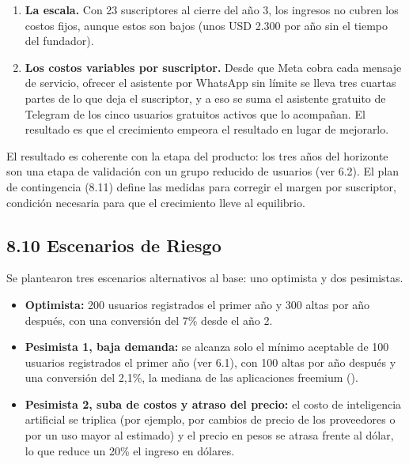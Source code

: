 \begin{enumerate}
\def\labelenumi{\arabic{enumi}.}
\tightlist
\item
  \textbf{La escala.} Con 23 suscriptores al cierre del año 3, los
  ingresos no cubren los costos fijos, aunque estos son bajos (unos USD
  2.300 por año sin el tiempo del fundador).
\item
  \textbf{Los costos variables por suscriptor.} Desde que Meta cobra
  cada mensaje de servicio, ofrecer el asistente por WhatsApp sin límite
  se lleva tres cuartas partes de lo que deja el suscriptor, y a eso se
  suma el asistente gratuito de Telegram de los cinco usuarios gratuitos
  activos que lo acompañan. El resultado es que el crecimiento empeora
  el resultado en lugar de mejorarlo.
\end{enumerate}

El resultado es coherente con la etapa del producto: los tres años del
horizonte son una etapa de validación con un grupo reducido de usuarios
(ver 6.2). El plan de contingencia (8.11) define las medidas para
corregir el margen por suscriptor, condición necesaria para que el
crecimiento lleve al equilibrio.

\subsection*{8.10 Escenarios de Riesgo}\label{escenarios-de-riesgo}

Se plantearon tres escenarios alternativos al base: uno optimista y dos
pesimistas.

\begin{itemize}
\tightlist
\item
  \textbf{Optimista:} 200 usuarios registrados el primer año y 300 altas
  por año después, con una conversión del 7\% desde el año 2.
\item
  \textbf{Pesimista 1, baja demanda:} se alcanza solo el mínimo
  aceptable de 100 usuarios registrados el primer año (ver 6.1), con 100
  altas por año después y una conversión del 2,1\%, la mediana de las
  aplicaciones freemium ().
\item
  \textbf{Pesimista 2, suba de costos y atraso del precio:} el costo de
  inteligencia artificial se triplica (por ejemplo, por cambios de
  precio de los proveedores o por un uso mayor al estimado) y el precio
  en pesos se atrasa frente al dólar, lo que reduce un 20\% el ingreso
  en dólares.
\end{itemize}


